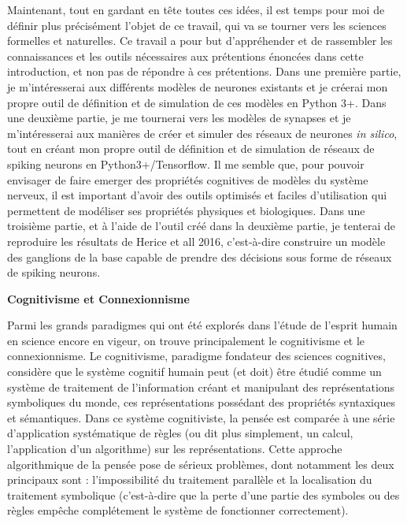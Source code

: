 \documentclass[12pt]{scrartcl}
\begin{document}
Maintenant, tout en gardant en tête toutes ces idées, il est temps pour moi de définir plus précisément l'objet de ce travail, qui va se tourner vers les sciences formelles et naturelles. Ce travail a pour but d'appréhender et de rassembler les connaissances et les outils nécessaires aux prétentions énoncées dans cette introduction, et non pas de répondre à ces prétentions. 
Dans une première partie, je m'intéresserai aux différents modèles de neurones existants et je créerai mon propre outil de définition et de simulation de ces modèles en Python 3+. Dans une deuxième partie, je me tournerai vers les modèles de synapses et je m'intéresserai aux manières de créer et simuler des réseaux de neurones \textit{in silico}, tout en créant mon propre outil de définition et de simulation de réseaux de spiking neurons en Python3+/Tensorflow. Il me semble que, pour pouvoir envisager de faire emerger des propriétés cognitives de modèles du système nerveux, il est important d'avoir des outils optimisés et faciles d'utilisation qui permettent de modéliser ses propriétés physiques et biologiques. Dans une troisième partie, et à l'aide de l'outil créé dans la deuxième partie, je tenterai de reproduire les résultats de Herice et all 2016, c'est-à-dire construire un modèle des ganglions de la base capable de prendre des décisions sous forme de réseaux de spiking neurons.
\pagebreak

\textbf{Cognitivisme et Connexionnisme} 

Parmi les grands paradigmes qui ont été explorés dans l'étude de l'esprit humain en science encore en vigeur, on trouve principalement le cognitivisme et le connexionnisme. Le cognitivisme, paradigme fondateur des sciences cognitives, considère que le système cognitif humain peut (et doit) être étudié comme un système de traitement de l'information créant et manipulant des représentations symboliques du monde, ces représentations possédant des propriétés syntaxiques et sémantiques. Dans ce système cognitiviste, la pensée est comparée à une série d'application systématique de règles (ou dit plus simplement, un calcul, l'application d'un algorithme) sur les représentations. Cette approche algorithmique de la pensée pose de sérieux problèmes, dont notamment les deux principaux sont : l'impossibilité du traitement parallèle et la localisation du traitement symbolique (c'est-à-dire que la perte d'une partie des symboles ou des règles empêche complétement le système de fonctionner correctement). 
\end{document}
